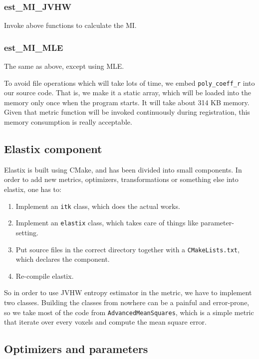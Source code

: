 \documentclass{IEEEtran}
\begin{document}
  \subsubsection{est\_MI\_JVHW}
  Invoke above functions to calculate the MI.

  \subsubsection{est\_MI\_MLE}
  The same as above, except using MLE.


  To avoid file operations which will take lots of time, we embed \texttt{poly\_coeff\_r} into our source code. That is, we make it a static array, which will be loaded into the memory only once when the program starts. It will take about 314 KB memory. Given that metric function will be invoked continuously during registration, this memory consumption is really acceptable.

  \subsection{Elastix component}

  Elastix is built using CMake, and has been divided into small components. In order to add new metrics, optimizers, transformations or something else into elastix, one has to:

  \begin{enumerate}
    \item Implement an \texttt{itk} class, which does the actual works.
    \item Implement an \texttt{elastix} class, which takes care of things like parameter-setting.
    \item Put source files in the correct directory together with a \texttt{CMakeLists.txt}, which declares the component.
    \item Re-compile elastix.
  \end{enumerate}

  So in order to use JVHW entropy estimator in the metric, we have to implement two classes. Building the classes from nowhere can be a painful and error-prone, so we take most of the code from \texttt{AdvancedMeanSquares}, which is a simple metric that iterate over every voxels and compute the mean square error.

  \subsection{Optimizers and parameters}
\end{document}
